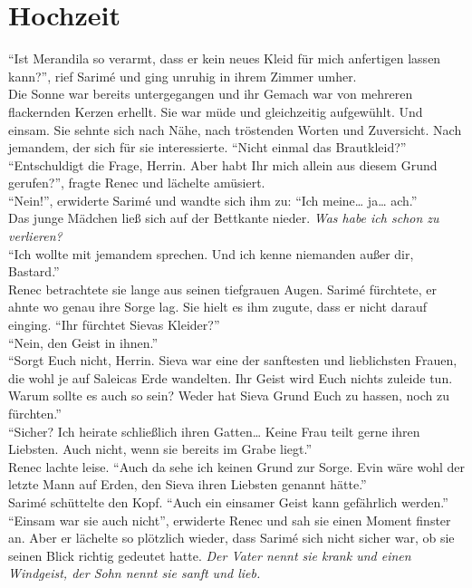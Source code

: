 \chapter{Hochzeit}

``Ist Merandila so verarmt, dass er kein neues Kleid für mich anfertigen lassen kann?'', rief 
Sarimé und ging unruhig in ihrem Zimmer umher. \\ 
Die Sonne war bereits untergegangen und ihr Gemach war von mehreren flackernden Kerzen erhellt. Sie 
war müde und gleichzeitig aufgewühlt. Und einsam. Sie sehnte sich nach Nähe, nach tröstenden Worten 
und Zuversicht. Nach jemandem, der sich für sie interessierte. ``Nicht einmal das Brautkleid?''\\
``Entschuldigt die Frage, Herrin. Aber habt Ihr mich allein aus diesem Grund gerufen?'', fragte 
Renec und lächelte amüsiert.\\
``Nein!'', erwiderte Sarimé und wandte sich ihm zu: ``Ich meine… ja… ach.''\\
Das junge Mädchen ließ sich auf der Bettkante nieder. \textit{Was habe ich schon zu verlieren?} \\
``Ich wollte mit jemandem sprechen. Und ich kenne niemanden außer dir, Bastard.''\\
Renec betrachtete sie lange aus seinen tiefgrauen Augen. Sarimé fürchtete, er ahnte wo genau ihre 
Sorge lag. Sie hielt es ihm zugute, dass er nicht darauf einging. ``Ihr fürchtet Sievas Kleider?''\\
``Nein, den Geist in ihnen.''\\
``Sorgt Euch nicht, Herrin. Sieva war eine der sanftesten und lieblichsten Frauen, die wohl je auf 
Saleicas Erde wandelten. Ihr Geist wird Euch nichts zuleide tun. Warum sollte es auch so sein? 
Weder hat Sieva Grund Euch zu hassen, noch zu fürchten.''\\
``Sicher? Ich heirate schließlich ihren Gatten… Keine Frau teilt gerne ihren Liebsten. Auch nicht, 
wenn sie bereits im Grabe liegt.''\\
Renec lachte leise. ``Auch da sehe ich keinen Grund zur Sorge. Evin wäre wohl der letzte Mann auf 
Erden, den Sieva ihren Liebsten genannt hätte.''\\
Sarimé schüttelte den Kopf. ``Auch ein einsamer Geist kann gefährlich werden.''\\
``Einsam war sie auch nicht'', erwiderte Renec und sah sie einen Moment finster an. Aber er 
lächelte so plötzlich wieder, dass Sarimé sich nicht sicher war, ob sie seinen Blick richtig 
gedeutet hatte.
\textit{Der Vater nennt sie krank und einen Windgeist, der Sohn nennt sie sanft und lieb.}\\
